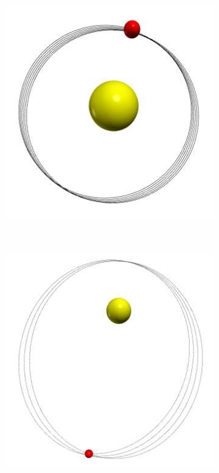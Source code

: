 \documentclass[12pt,ngerman,american]{iopart}
\begin{document}
\begin{figure}[htb]
	\centering
	\begin{subfigure}[c]{0.22\textwidth}
		\includegraphics[width=\textwidth]{figs/a6T5dt20.png}
		\caption{\label{fig:MercuryOrbit-a6-small}}
	\end{subfigure}
	~
	\begin{subfigure}[c]{0.22\textwidth}
		\includegraphics[width=\textwidth]{figs/a6T10dt20.png}

\end{subfigure}
\end{figure}
\end{document}
